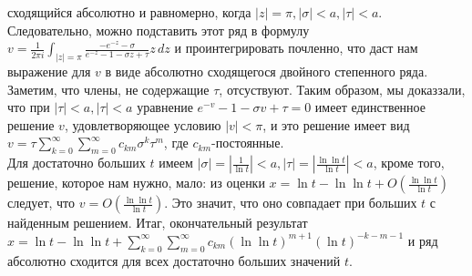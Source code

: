 \documentclass{report}
\begin{document}
сходящийся абсолютно и равномерно, когда $|z|=\pi,|\sigma|<a,|\tau|<a$. Следовательно, можно подставить этот ряд в формулу $v=\frac{1}{2\pi{i}}\int_{|z|=\pi}\frac{-e^{-z}-\sigma}{e^{-z}-1-\sigma{z}+\tau}z\,dz$ 
и проинтегрировать почленно, что даст нам выражение для $v$ в виде абсолютно сходящегося двойного степенного ряда. Заметим, что члены, не содержащие $\tau$, отсуствуют.
Таким образом, мы доказзали, что при $|\tau|<a,|\tau|<a$ уравнение $e^{-v}-1-\sigma{v}+\tau=0$ имеет единственное решение $v$, удовлетворяющее условию $|v|<\pi$, и это решение имеет вид \\
$v=\tau\sum_{k=0}^{\infty}\sum_{m=0}^{\infty}c_{km}\sigma^{k}\tau^{m}$, где $c_{km}$-постоянные. \\
Для достаточно больших $t$ имеем $|\sigma|=|\frac{1}{\ln{t}}|<a, |\tau|=|\frac{\ln\ln{t}}{\ln{t}}|<a$, кроме того, решение, которое нам нужно, мало: из оценки $x=\ln{t}-\ln\ln{t}+O\left(\frac{\ln\ln{t}}{\ln{t}}\right)$
следует, что $v=O\left(\frac{\ln\ln{t}}{\ln{t}}\right)$. Это значит, что оно совпадает при больших $t$ с найденным решением. Итаг, окончательный результат \\
$x=\ln{t}-\ln\ln{t}+\sum_{k=0}^{\infty}\sum_{m=0}^{\infty}c_{km}(\ln\ln{t})^{m+1}(\ln{t})^{-k-m-1}$  и ряд абсолютно сходится для всех достаточно больших значений $t$.
\newpage
\end{document}
